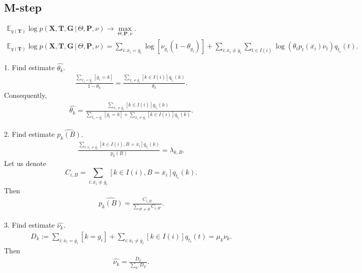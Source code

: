 \documentclass[10pt]{article}
\begin{document}
\subsection{M-step}
\begin{gather}
    \nonumber
    \mathbb E_{q(\mathbf T)} \log p(\mathbf X, \mathbf T, \mathbf G \, | \, \Theta, \mathbf P, \nu) \to 
    \max_{\Theta, \mathbf P, \nu}.\\
    \mathbb E_{q(\mathbf T)} \log p(\mathbf X, \mathbf T, \mathbf G \, | \, \Theta, \mathbf P, \nu) =
    \sum_{i: \overline x_i = \overline g_i} \log [\nu_{g_i} (1 - \theta_{g_i})] + 
    \sum_{i: \overline x_i \neq \overline g_i} \sum_{t \in I(i)}
        \log\left(\theta_{t} p_{t}(\overline{x_i}) \nu_t\right) q_{t_i}(t).
\end{gather}

1. Find estimate $\widehat{\theta_k}$.
\begin{gather}
    \frac{\sum_{\overline x_i =    \overline g_i} [g_i = k]}{1 - \theta_k} = 
    \frac{\sum_{\overline x_i \neq \overline g_i} [k \in I(i)] q_{t_i}(k)}{\theta_k}.
\end{gather}
Consequently,
\begin{gather}
    \widehat{\theta_k} = 
    \frac{\sum_{\overline x_i \neq \overline g_i} [k \in I(i)] q_{t_i}(k)}
         {\sum_{\overline x_i =    \overline g_i} [g_i = k] +
          \sum_{\overline x_i \neq \overline g_i} [k \in I(i)] q_{t_i}(k)}.
\end{gather}

2. Find estimate $\widehat{p_k(B)}$.
\begin{gather}
    \frac{\sum_{i: \overline x_i \neq \overline g_i} [k \in I(i), B = \overline x_i] q_{t_i}(k)}{p_k(B)} =
    \lambda_{k,B}.
\end{gather}
Let us denote
$$C_{i, B} = \sum_{i: \overline x_i \neq \overline g_i} [k \in I(i), B = \overline x_i] q_{t_i}(k).$$
Then
\begin{gather}
    \widehat{p_k(B)} = 
    \frac{C_{i, B}}{\sum_{B'\neq B} C_{i, B'}}.
\end{gather}

3. Find estimate $\widehat{\nu_k}$.
\begin{gather}
    D_k := 
    \sum_{i: \overline x_i =    \overline g_i} [k = g_i] +
    \sum_{i: \overline x_i \neq \overline g_i} [k \in I(i)] q_{t_i}(t) =
    \mu_k \nu_k.
\end{gather}
Then
\begin{gather}
    \widehat{\nu_k} = \frac{D_k}{\sum_{k'} D_{k'}}.
\end{gather}
\end{document}
